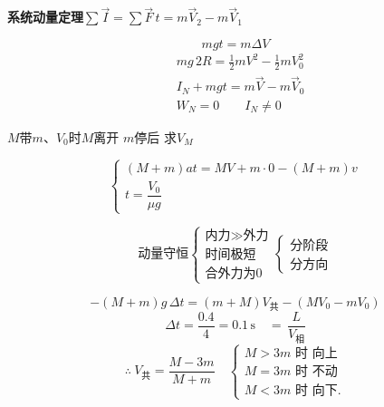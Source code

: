 \textbf{系统动量定理}\quad $\sum\vec I=\sum\vec F\,t=m\vec V_2-m\vec V_1$

\[
mgt=m\Delta V
\]
\begin{align*}
&mg\,2R=\tfrac12 mV^2-\tfrac12 mV_0^2\\
&I_N+mgt=m\vec V-m\vec V_0\\
&W_N=0\qquad I_N\ne0
\end{align*}
\begin{problem}
$M$带$m$、$V_0$时$M$离开 $m$停后 求$V_M$
\begin{solution}
\[
\begin{cases}
(M+m)at=MV+m\cdot0-(M+m)v\\[2pt]
t=\dfrac{V_0}{\mu g}
\end{cases}
\]
\end{solution}
\end{problem}
\[
\text{动量守恒}
\left\{
\begin{array}{l}
\text{内力}\gg\text{外力}\\
\text{时间极短}\\
\text{合外力为0}
\end{array}
\right.
\left\{
\begin{array}{l}
\text{分阶段}\\
\text{分方向}
\end{array}
\right.
\]
\begin{problem}
\begin{solution}
\[
-(M+m)g\,\Delta t=(m+M)V_{\text{共}}-(MV_0-mV_0)
\]
\[
\Delta t=\dfrac{0.4}{4}=0.1\,\mathrm{s}\quad {=}\,\dfrac{L}{V_{\text{相}}}
\]
\[
\therefore\ V_{\text{共}}=\dfrac{M-3m}{M+m}\quad
\begin{cases}
M>3m\text{ 时 向上}\\
M=3m\text{ 时 不动}\\
M<3m\text{ 时 向下.}
\end{cases}
\]
\end{solution}
\end{problem}
